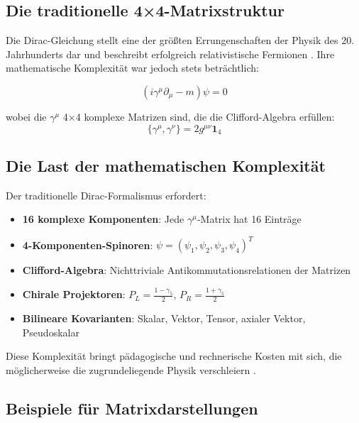 \documentclass[12pt,a4paper]{report}
\begin{document}
	\subsection{Die traditionelle 4×4-Matrixstruktur}
	\label{subsec:traditional_matrices}
	
	Die Dirac-Gleichung stellt eine der größten Errungenschaften der Physik des 20. Jahrhunderts dar und beschreibt erfolgreich relativistische Fermionen \cite{dirac_original_1928}. Ihre mathematische Komplexität war jedoch stets beträchtlich:
	
	\begin{equation}
		(i\gamma^\mu \partial_\mu - m)\psi = 0
		\label{eq:dirac_traditional}
	\end{equation}
	
	wobei die $\gamma^\mu$ 4×4 komplexe Matrizen sind, die die Clifford-Algebra erfüllen:
	\begin{equation}
		\{\gamma^\mu, \gamma^\nu\} = 2g^{\mu\nu} \mathbf{1}_4
		\label{eq:clifford_algebra}
	\end{equation}
	
	\subsection{Die Last der mathematischen Komplexität}
	\label{subsec:mathematical_burden}
	
	Der traditionelle Dirac-Formalismus erfordert:
	\begin{itemize}
		\item \textbf{16 komplexe Komponenten}: Jede $\gamma^\mu$-Matrix hat 16 Einträge
		\item \textbf{4-Komponenten-Spinoren}: $\psi = (\psi_1, \psi_2, \psi_3, \psi_4)^T$
		\item \textbf{Clifford-Algebra}: Nichttriviale Antikommutationsrelationen der Matrizen
		\item \textbf{Chirale Projektoren}: $P_L = \frac{1-\gamma_5}{2}$, $P_R = \frac{1+\gamma_5}{2}$
		\item \textbf{Bilineare Kovarianten}: Skalar, Vektor, Tensor, axialer Vektor, Pseudoskalar
	\end{itemize}
	
	Diese Komplexität bringt pädagogische und rechnerische Kosten mit sich, die möglicherweise die zugrundeliegende Physik verschleiern \cite{weinberg_qft_1995}.
	
	\subsection{Beispiele für Matrixdarstellungen}
	\label{subsec:matrix_examples}
	
\end{document}
